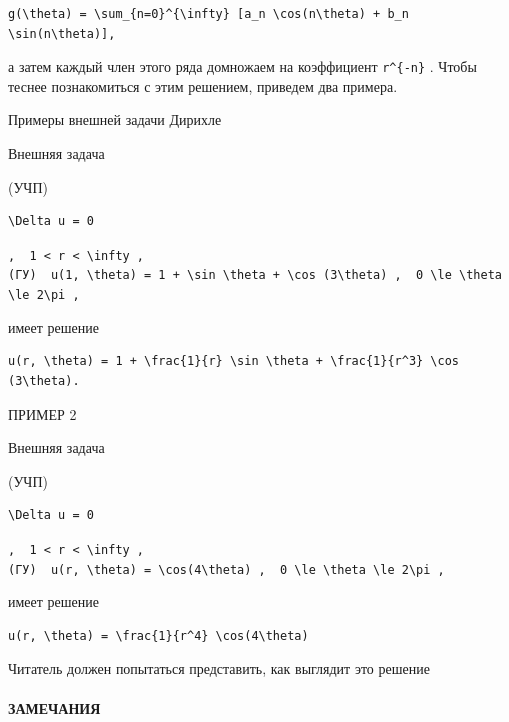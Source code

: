 \documentclass[
  ukrainian,
]{article}
\begin{document}
\begin{verbatim}
g(\theta) = \sum_{n=0}^{\infty} [a_n \cos(n\theta) + b_n \sin(n\theta)],
\end{verbatim}

а затем каждый член этого ряда домножаем на коэффициент
\texttt{r\^{}\{-n\}} . Чтобы теснее познакомиться с этим решением,
приведем два примера.

Примеры внешней задачи Дирихле

Внешняя задача

(УЧП)

\begin{verbatim}
\Delta u = 0
\end{verbatim}

\texttt{,\ \ \textquotesingle{}1\ \textless{}\ r\ \textless{}\ \textbackslash{}infty\textquotesingle{}\ ,}
\texttt{(ГУ)\ \ \textquotesingle{}u(1,\ \textbackslash{}theta)\ =\ 1\ +\ \textbackslash{}sin\ \textbackslash{}theta\ +\ \textbackslash{}cos\ (3\textbackslash{}theta)\textquotesingle{}\ ,\ \ \textquotesingle{}0\ \textbackslash{}le\ \textbackslash{}theta\ \textbackslash{}le\ 2\textbackslash{}pi\textquotesingle{}\ ,}

имеет решение

\begin{verbatim}
u(r, \theta) = 1 + \frac{1}{r} \sin \theta + \frac{1}{r^3} \cos (3\theta).
\end{verbatim}

ПРИМЕР 2

Внешняя задача

(УЧП)

\begin{verbatim}
\Delta u = 0
\end{verbatim}

\texttt{,\ \ \textquotesingle{}1\ \textless{}\ r\ \textless{}\ \textbackslash{}infty\textquotesingle{}\ ,}
\texttt{(ГУ)\ \ \textquotesingle{}u(r,\ \textbackslash{}theta)\ =\ \textbackslash{}cos(4\textbackslash{}theta)\textquotesingle{}\ ,\ \ \textquotesingle{}0\ \textbackslash{}le\ \textbackslash{}theta\ \textbackslash{}le\ 2\textbackslash{}pi\textquotesingle{}\ ,}

имеет решение

\begin{verbatim}
u(r, \theta) = \frac{1}{r^4} \cos(4\theta)
\end{verbatim}

Читатель должен попытаться представить, как выглядит это решение

\paragraph{ЗАМЕЧАНИЯ}\label{ux437ux430ux43cux435ux447ux430ux43dux438ux44f-9}
\end{document}
